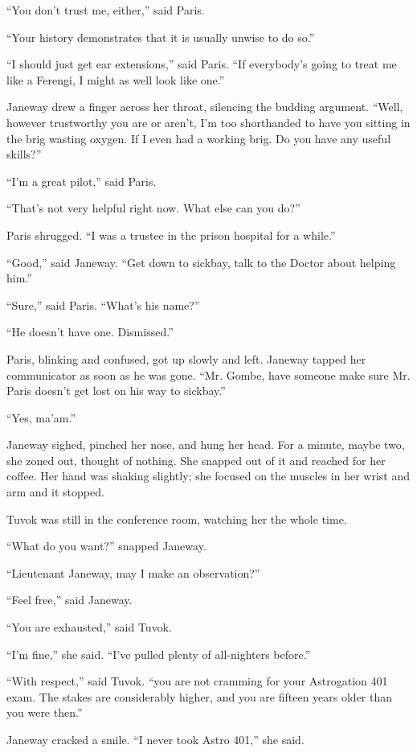 \documentclass[twoside,letterpaper,12pt]{memoir}
\begin{document}
``You don't trust me, either,'' said Paris.

``Your history demonstrates that it is usually unwise to do so.''

``I should just get ear extensions,'' said Paris. ``If everybody's going to treat me like a Ferengi, I might as well look like one.''

Janeway drew a finger across her throat, silencing the budding argument. ``Well, however trustworthy you are or aren't, I'm too shorthanded to have you sitting in the brig wasting oxygen. If I even had a working brig. Do you have any useful skills?''

``I'm a great pilot,'' said Paris.

``That's not very helpful right now. What else can you do?''

Paris shrugged. ``I was a trustee in the prison hospital for a while.''

``Good,'' said Janeway. ``Get down to sickbay, talk to the Doctor about helping him.''

``Sure,'' said Paris. ``What's his name?''

``He doesn't have one. Dismissed.''

Paris, blinking and confused, got up slowly and left. Janeway tapped her communicator as soon as he was gone. ``Mr. Gombe, have someone make sure Mr. Paris doesn't get lost on his way to sickbay.''

``Yes, ma'am.''

Janeway sighed, pinched her nose, and hung her head. For a minute, maybe two, she zoned out, thought of nothing. She snapped out of it and reached for her coffee. Her hand was shaking slightly; she focused on the muscles in her wrist and arm and it stopped.

Tuvok was still in the conference room, watching her the whole time.

``What do you want?'' snapped Janeway.

``Lieutenant Janeway, may I make an observation?''

``Feel free,'' said Janeway.

``You are exhausted,'' said Tuvok.

``I'm fine,'' she said. ``I've pulled plenty of all-nighters before.''

``With respect,'' said Tuvok. ``you are not cramming for your Astrogation 401 exam. The stakes are considerably higher, and you are fifteen years older than you were then.''

Janeway cracked a smile. ``I never took Astro 401,'' she said.
\end{document}
